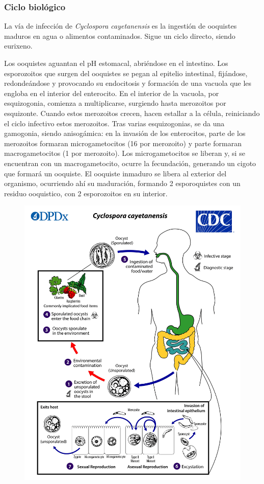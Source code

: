 \subsubsection{Ciclo biológico}
\begin{multicols}{2}
	La vía de infección de \textit{Cyclospora cayetanensis} es la ingestión de ooquistes maduros en agua o alimentos contaminados. Sigue un ciclo directo, siendo eurixeno.
	
	Los ooquistes aguantan el pH estomacal, abriéndose en el intestino. Los esporozoitos que surgen del ooquistes se pegan al epitelio intestinal, fijándose, redondeándose y provocando su endocitosis y formación de una vacuola que les engloba en el interior del enterocito. En el interior de la vacuola, por esquizogonia, comienza a multiplicarse, surgiendo hasta merozoitos por esquizonte. Cuando estos merozoitos crecen, hacen estallar a la célula, reiniciando el ciclo infectivo estos merozoitos. Tras varias esquizogonias, se da una gamogonia, siendo anisogámica: en la invasión de los enterocitos, parte de los merozoitos formaran microgametocitos (16 por merozoito) y parte formaran macrogametocitos (1 por merozoito). Los microgametocitos se liberan y, si se encuentran con un macrogametocito, ocurre la fecundación, generando un cigoto que formará un ooquiste. El ooquiste inmaduro se libera al exterior del organismo, ocurriendo ahí su maduración, formando 2 esporoquistes con un residuo ooquistico, con 2 esporozoitos en su interior.
	\columnbreak
	\begin{figure}[H]
		\centering
		\includegraphics[width=\columnwidth]{A.imagenes/ACV-BioSan-Parasit-CcayetanensisCbios}

\end{figure}
\end{multicols}
